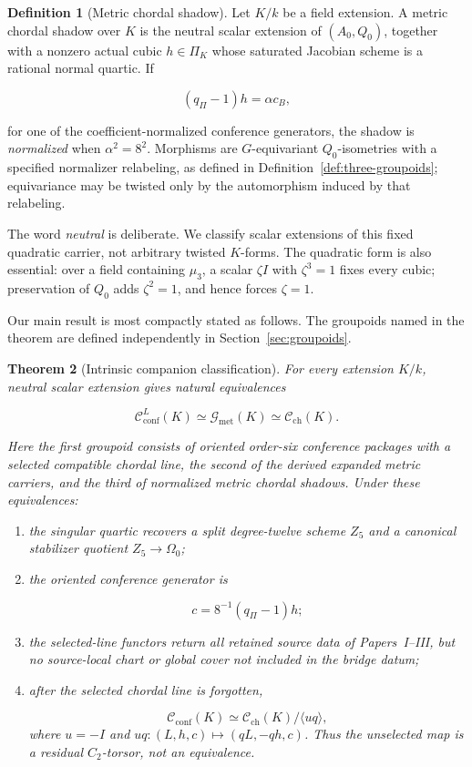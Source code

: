 \documentclass[11pt]{article}
\newtheorem{theorem}{Theorem}[section]
\theoremstyle{definition}
\newtheorem{definition}[theorem]{Definition}
\theoremstyle{remark}
\newcommand{\cC}{\mathscr C}
\newcommand{\cG}{\mathscr G}
\begin{document}
\begin{definition}[Metric chordal shadow]
\label{def:metric-chordal-shadow}
Let \(K/k\) be a field extension.  A metric chordal shadow over \(K\) is the
neutral scalar extension of \((A_0,Q_0)\), together with a nonzero actual
cubic \(h\in\Pi_K\) whose saturated Jacobian scheme is a rational normal
quartic.  If

\[
                   (q_\Pi-1)h=\alpha c_B,
\]

for one of the coefficient-normalized conference generators, the shadow is
\emph{normalized} when \(\alpha^2=8^2\).  Morphisms are \(G\)-equivariant
\(Q_0\)-isometries with a specified normalizer relabeling, as defined in
Definition~\ref{def:three-groupoids}; equivariance may be twisted only by the
automorphism induced by that relabeling.
\end{definition}

The word \emph{neutral} is deliberate.  We classify scalar extensions of this
fixed quadratic carrier, not arbitrary twisted \(K\)-forms.  The quadratic
form is also essential: over a field containing \(\mu_3\), a scalar
\(\zeta I\) with \(\zeta^3=1\) fixes every cubic; preservation of \(Q_0\)
adds \(\zeta^2=1\), and hence forces \(\zeta=1\).

Our main result is most compactly stated as follows.  The groupoids named in
the theorem are defined independently in Section~\ref{sec:groupoids}.

\begin{theorem}[Intrinsic companion classification]
\label{thm:intrinsic-companion-classification}
For every extension \(K/k\), neutral scalar extension gives natural
equivalences

\[
 \cC_{\mathrm{conf}}^{L}(K)
   \simeq \cG_{\mathrm{met}}(K)
   \simeq \cC_{\mathrm{ch}}(K).
\]

Here the first groupoid consists of oriented order-six conference packages
with a selected compatible chordal line, the second of the derived expanded
metric carriers, and the third of normalized metric chordal shadows.  Under
these equivalences:

\begin{enumerate}[label=\textup{(\roman*)},leftmargin=2.4em]
\item the singular quartic recovers a split degree-twelve scheme \(Z_5\) and
  a canonical stabilizer quotient \(Z_5\to\Omega_0\);
\item the oriented conference generator is

  \[
                        c=8^{-1}(q_\Pi-1)h;
  \]
\item the selected-line functors return all retained source data of
  Papers~I--III, but no source-local chart or global cover not included in the
  bridge datum;
\item after the selected chordal line is forgotten,

  \[
     \cC_{\mathrm{conf}}(K)
       \simeq \cC_{\mathrm{ch}}(K)/\langle uq\rangle,
  \]
  where \(u=-I\) and \(uq:(L,h,c)\mapsto(qL,-qh,c)\).  Thus the unselected
  map is a residual \(C_2\)-torsor, not an equivalence.
\end{enumerate}
\end{theorem}
\end{document}
